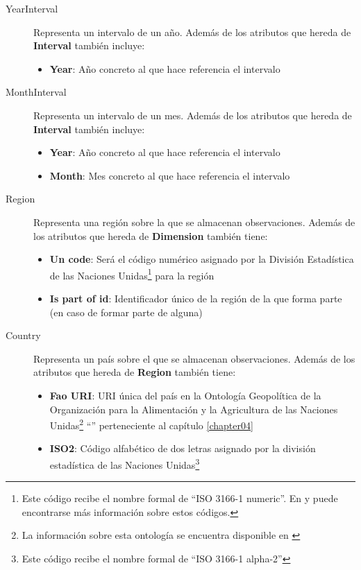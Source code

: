 \begin{description}
\begin{itemize}
	\end{itemize}
	\item[YearInterval]  Representa un intervalo de un año.  Además de los atributos que hereda de \textbf{Interval} también incluye:
	\begin{itemize}
		\item \textbf{Year}:  Año concreto al que hace referencia el intervalo
	\end{itemize}
	\item[MonthInterval]  Representa un intervalo de un mes.  Además de los atributos que hereda de \textbf{Interval} también incluye:
	\begin{itemize}
		\item \textbf{Year}:  Año concreto al que hace referencia el intervalo
		\item \textbf{Month}:  Mes concreto al que hace referencia el intervalo
	\end{itemize}
	\item[Region]  Representa una región sobre la que se almacenan observaciones.  Además de los atributos que hereda de \textbf{Dimension} también tiene:
	\begin{itemize}
		\item \textbf{Un code}:  Será el código numérico asignado por la División Estadística de las Naciones Unidas\footnote{Este código recibe el nombre formal de ``ISO 3166-1 numeric''.  En \cite{un:standard-country-codes} y \cite{un:iso-3166-country-codes} puede encontrarse más información sobre estos códigos.} para la región
		\item \textbf{Is part of id}:  Identificador único de la región de la que forma parte (en caso de formar parte de alguna)
	\end{itemize}
	\item[Country]  Representa un país sobre el que se almacenan observaciones.  Además de los atributos que hereda de \textbf{Region} también tiene:
	\begin{itemize}
		\item \textbf{Fao URI}:  URI única del país en la Ontología Geopolítica de la Organización para la Alimentación y la Agricultura de las Naciones Unidas\footnote{La información sobre esta ontología se encuentra disponible en \cite{fao:geopolitical-ontology}} ``'' perteneciente al capítulo \ref{chapter04}
		\item \textbf{ISO2}:  Código alfabético de dos letras asignado por la división estadística de las Naciones Unidas\footnote{Este código recibe el nombre formal de ``ISO 3166-1 alpha-2''}

\end{itemize}
\end{description}
